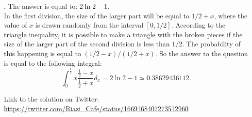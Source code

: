 \begin{solution}.
The answer is equal to: $2 \ln 2 - 1$.\\[0.2cm]

In the first division, the size of the larger part will be equal to $1/2 + x$, where the value of $x$ is drawn randomly from the interval $[0,1/2]$. According to the triangle inequality, it is possible to make a triangle with the broken pieces if the size of the larger part of the second division is less than $1/2$. The probability of this happening is equal to $(1/2 - x)/(1/2+x)$. So the answer to the question is equal to the following integral:
$$\int_{0}^{\frac{1}{2}} x \frac{\frac{1}{2} - x}{\frac{1}{2} + x} d_x  = 2\ln 2-1 \simeq 0.38629436112.$$



Link to the solution on Twitter:  \url{https://twitter.com/Riazi_Cafe/status/1669168407273512960}\end{solution}